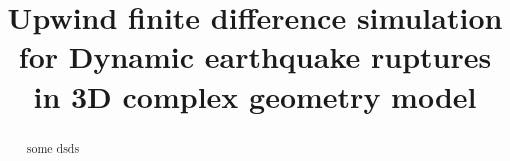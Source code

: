 \documentclass{article}
\title{\large{\textbf{Upwind finite difference simulation for Dynamic earthquake ruptures  in 3D complex geometry model }}}
\author{}
\theoremstyle{definition}
\begin{document}
\maketitle

\begin{abstract}
   some dsds
\end{abstract}
\end{document}
